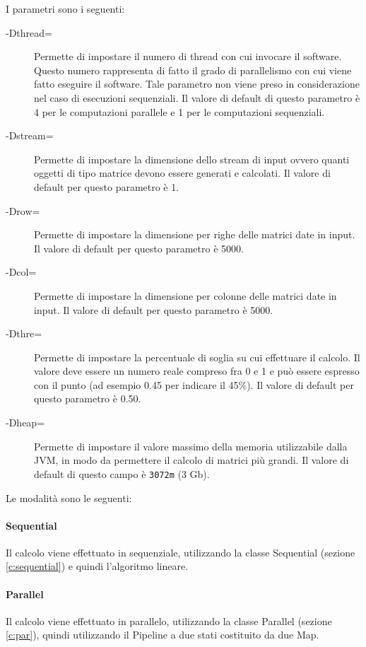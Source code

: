\documentclass[a4paper,10pt]{article}
\begin{document}
I parametri sono i seguenti:
\begin{description}
\item[-Dthread=] Permette di impostare il numero di thread con cui invocare il software. Questo numero rappresenta di fatto il grado di parallelismo con cui viene fatto eseguire il software. Tale parametro non viene preso in considerazione nel caso di esecuzioni sequenziali. Il valore di default di questo parametro \`e 4 per le computazioni parallele e 1 per le computazioni sequenziali.
\item[-Dstream=] Permette di impostare la dimensione dello stream di input ovvero quanti oggetti di tipo matrice devono essere generati e calcolati. Il valore di default per questo parametro \`e 1.
\item[-Drow=] Permette di impostare la dimensione per righe delle matrici date in input. Il valore di default per questo parametro \`e 5000.
\item[-Dcol=] Permette di impostare la dimensione per colonne delle matrici date in input. Il valore di default per questo parametro \`e 5000.
\item[-Dthre=] Permette di impostare la percentuale di soglia su cui effettuare il calcolo. Il valore deve essere un numero reale compreso fra 0 e 1 e pu\`o essere espresso con il punto (ad esempio 0.45 per indicare il 45\%). Il valore di default per questo parametro \`e 0.50.
\item[-Dheap=] Permette di impostare il valore massimo della memoria utilizzabile dalla JVM, in modo da permettere il calcolo di matrici pi\`u grandi. Il valore di default di questo campo \`e \texttt{3072m} (3 Gb).
\end{description}

Le modalit\`a sono le seguenti:
\paragraph{Sequential} Il calcolo viene effettuato in sequenziale, utilizzando la classe \textsf{Sequential} (sezione \ref{c:sequential}) e quindi l'algoritmo lineare.

\paragraph{Parallel} Il calcolo viene effettuato in parallelo, utilizzando la classe \textsf{Parallel} (sezione \ref{c:par}), quindi utilizzando il \textsf{Pipeline} a due stati costituito da due \textsf{Map}.
\end{document}
